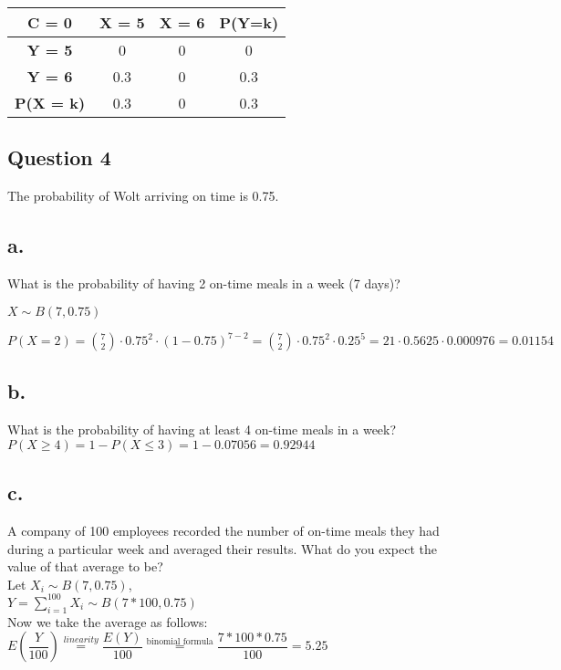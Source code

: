 \documentclass[12pt]{article}
\newcommand\tab[1][1cm]{\hspace*{#1}}
\begin{document}
\begin{center}
\begin{tabular}{|c|c|c|c|}
\hline
\textbf{C = 0}      & \textbf{X = 5} & \textbf{X = 6} & \textbf{P(Y=k)} \\ 
\hline
\textbf{Y = 5}      & 0                      & 0                     & 0                        \\ 
\hline
\textbf{Y = 6}      & 0.3                  & 0                     & 0.3                    \\ 
\hline
\textbf{P(X = k)} & 0.3                   & 0                    & 0.3                    \\ 
\hline
\end{tabular}
\end{center}

\newpage

\begin{center}
\section*{Question 4}
\end{center}

The probability of Wolt arriving on time is 0.75.

\subsection*{a.} 

What is the probability of having 2 on-time meals in a week (7 days)?

$ X \sim B(7, 0.75) $

$ P(X=2) = \binom{7}{2} \cdot 0.75^2 \cdot(1-0.75)^{7-2} = \binom{7}{2} \cdot 0.75^2 \cdot 0.25^5 = 21 \cdot 0.5625 \cdot 0.000976 = 0.01154 $

\subsection*{b.}

What is the probability of having at least 4 on-time meals in a week? \\

$ P(X \geq 4) =  1 - P(X \leq 3) = 1 - 0.07056 = 0.92944$ 

\subsection*{c.}

\tab A company of 100 employees recorded the number of on-time meals they had during a particular week and averaged their results. What do you expect the value of that average to be? \\

Let $X_i \sim B(7, 0.75) $, \\

$Y = \sum_{i=1}^{100} X_i \sim B(7* 100, 0.75) $\\

Now we take the average as follows: \\

$E(\dfrac{Y}{100}) \stackrel{linearity}{=} \dfrac{E(Y)}{100} \stackrel{\text{binomial formula}}{=} \dfrac{7*100*0.75}{100}  = 5.25 $

    
\end{document}
